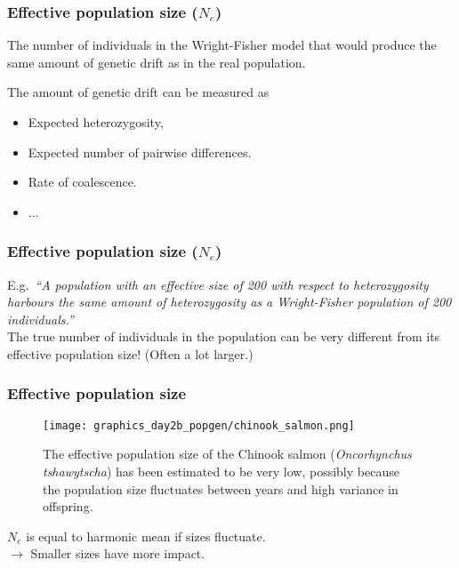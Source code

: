 \documentclass{beamer}
\newcommand{\1}{\ensuremath{\mathbf{1}}}
\begin{document}
%
%
%
\begin{frame}\frametitle{Effective population size ($N_e$)}
	\begin{block}{}
		The number of individuals in the Wright-Fisher model that would produce the same amount of genetic drift as in the real population.
	\end{block}
	The amount of genetic drift can be measured as
	\begin{itemize}
		\item Expected heterozygosity,
		\item Expected number of pairwise differences.
		\item Rate of coalescence.
		\item ...
	\end{itemize}
\end{frame}
%
%
%
\begin{frame}\frametitle{Effective population size ($N_e$)}
	E.g.\ \emph{``A population with an effective size of 200 with respect to heterozygosity harbours the same amount of heterozygosity as a Wright-Fisher population of 200 individuals.''}\\[2ex]
	The true number of individuals in the population can be very different from its effective population size! (Often a lot larger.)
\end{frame}
%
%
%
\begin{frame}\frametitle{Effective population size}
	\begin{figure}
	\begin{center}
		\texttt{[image: graphics\_day2b\_popgen/chinook\_salmon.png]}
	\end{center}
	\caption{The effective population size of the Chinook salmon (\emph{Oncorhynchus tshawytscha}) has been estimated to be very low, possibly because the population size fluctuates between years and high variance in offspring.}
	\end{figure}
	$N_e$ is equal to harmonic mean if sizes fluctuate.\\
	$\to$ Smaller sizes have more impact.
\end{frame}
\end{document}
